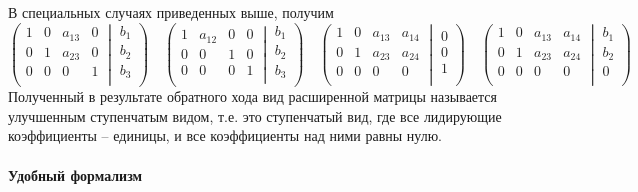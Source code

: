 В специальных случаях приведенных выше, получим
\[
\left(\left.
\begin{matrix}
1& 0&a_{13}& 0\\
0& 1&a_{23}& 0\\
0& 0&0&1\\
\end{matrix}
\:\right|\:
\begin{matrix}
b_1\\
b_2\\
b_3\\
\end{matrix}
\right)
\quad
\left(\left.
\begin{matrix}
1& a_{12}&0& 0\\
0& 0&1& 0\\
0& 0&0&1\\
\end{matrix}
\:\right|\:
\begin{matrix}
b_1\\
b_2\\
b_3\\
\end{matrix}
\right)
\quad
\left(\left.
\begin{matrix}
1& 0&a_{13}& a_{14}\\
0&1&a_{23}& a_{24}\\
0& 0&0& 0\\
\end{matrix}
\:\right|\:
\begin{matrix}
0\\
0\\
1\\
\end{matrix}
\right)
\quad
\left(\left.
\begin{matrix}
1&0&a_{13}& a_{14}\\
0& 1&a_{23}& a_{24}\\
0& 0&0& 0\\
\end{matrix}
\:\right|\:
\begin{matrix}
b_1\\
b_2\\
0\\
\end{matrix}
\right)
\]
Полученный в результате обратного хода вид расширенной матрицы называется улучшенным ступенчатым видом, т.е. это ступенчатый вид, где все лидирующие коэффициенты -- единицы, и все коэффициенты над ними равны нулю.

\paragraph{Удобный формализм}

